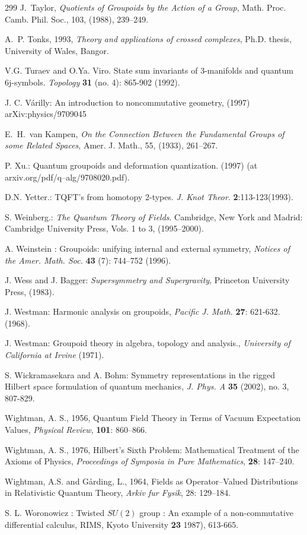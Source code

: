 \documentclass[12pt]{article}
\theoremstyle{plain}
\theoremstyle{definition}
\numberwithin{equation}{section}
\begin{document}
\begin{thebibliography} {299}
J.~{T}aylor, {\em Quotients of Groupoids by the Action of a
Group\/}, Math. Proc. {C}amb. Phil. Soc., 103, (1988), 239--249.

A.~P. Tonks, 1993, {\em Theory and applications of crossed
complexes\/}, Ph.D. thesis, University of Wales, Bangor.

V.G. Turaev and O.Ya. Viro. State sum invariants of 3-manifolds and quantum
6j-symbols. \textit{Topology} \textbf{31} (no. 4): 865-902 (1992).

J. C. V\'arilly: An introduction to noncommutative geometry, (1997)
arXiv:physics/9709045

E.~H.~van {Kampen}, {\em On the Connection Between the Fundamental
Groups of some Related Spaces\/}, Amer. J. Math., 55, (1933), 261--267.

P. Xu.: Quantum groupoids and deformation quantization. (1997)
(at arxiv.org/pdf/q--alg/9708020.pdf).

D.N. Yetter.: TQFT's from homotopy 2-types. \textit{J. Knot Theor}. \textbf{2}:113-123(1993).

S. Weinberg.: \emph{The Quantum Theory of Fields}. Cambridge, New York and Madrid: %
Cambridge University Press, Vols. 1 to 3, (1995--2000).

A. Weinstein : Groupoids: unifying internal and external symmetry,
\emph{Notices of the Amer. Math. Soc.} \textbf{43} (7): 744--752 (1996).

J. Wess and J. Bagger: \emph{Supersymmetry and Supergravity},
Princeton University Press, (1983).

J. Westman: Harmonic analysis on groupoids, \textit{Pacific J. Math.} \textbf{27}: 621-632. (1968).

J. Westman: Groupoid theory in algebra, topology and analysis., \textit{University of California at Irvine} (1971).

S. Wickramasekara and A. Bohm: Symmetry representations in the rigged Hilbert space formulation of quantum mechanics, \emph{J. Phys. A} \textbf{35} (2002), no. 3, 807-829.

Wightman, A. S., 1956, Quantum Field Theory in Terms of Vacuum Expectation Values, \emph{Physical Review}, \textbf{101}: 860--866.

Wightman, A. S., 1976, Hilbert's Sixth Problem: Mathematical Treatment of the Axioms of Physics, \emph{Proceedings of Symposia in Pure Mathematics}, \textbf{28}: 147--240.

Wightman, A.S. and G\aa{}rding, L., 1964, Fields as Operator--Valued Distributions in
Relativistic Quantum Theory, \emph{Arkiv fur Fysik}, 28: 129--184.

S. L. Woronowicz : Twisted $SU(2)$ group : An example of a non-commutative differential calculus, RIMS, Kyoto University \textbf{23} 1987), 613-665.


\end{thebibliography}

\end{document}
